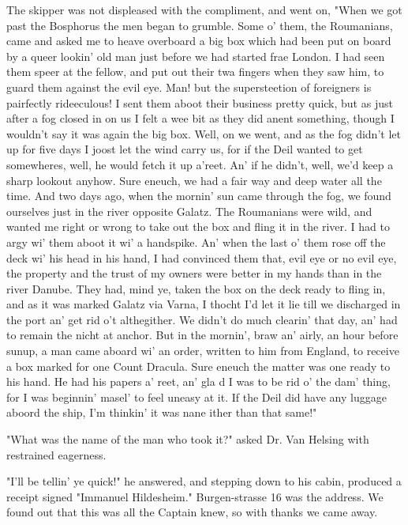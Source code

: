 The skipper was not displeased with the compliment, and went on, "When we got past the Bosphorus the men began to grumble. Some o' them, the Roumanians, came and asked me to heave overboard a big box which had been put on board by a queer lookin' old man just before we had started frae London. I had seen them speer at the fellow, and put out their twa fingers when they saw him, to guard them against the evil eye. Man! but the supersteetion of foreigners is pairfectly rideeculous! I sent them aboot their business pretty quick, but as just after a fog closed in on us I felt a wee bit as they did anent something, though I wouldn't say it was again the big box. Well, on we went, and as the fog didn't let up for five days I joost let the wind carry us, for if the Deil wanted to get somewheres, well, he would fetch it up a'reet. An' if he didn't, well, we'd keep a sharp lookout anyhow. Sure eneuch, we had a fair way and deep water all the time. And two days ago, when the mornin' sun came through the fog, we found ourselves just in the river opposite Galatz. The Roumanians were wild, and wanted me right or wrong to take out the box and fling it in the river. I had to argy wi' them aboot it wi' a handspike. An' when the last o' them rose off the deck wi' his head in his hand, I had convinced them that, evil eye or no evil eye, the property and the trust of my owners were better in my hands than in the river Danube. They had, mind ye, taken the box on the deck ready to fling in, and as it was marked Galatz via Varna, I thocht I'd let it lie till we discharged in the port an' get rid o't althegither. We didn't do much clearin' that day, an' had to remain the nicht at anchor. But in the mornin', braw an' airly, an hour before sunup, a man came aboard wi' an order, written to him from England, to receive a box marked for one Count Dracula. Sure eneuch the matter was one ready to his hand. He had his papers a' reet, an' gla d I was to be rid o' the dam' thing, for I was beginnin' masel' to feel uneasy at it. If the Deil did have any luggage aboord the ship, I'm thinkin' it was nane ither than that same!" 

"What was the name of the man who took it?" asked Dr. Van Helsing with restrained eagerness. 

"I'll be tellin' ye quick!" he answered, and stepping down to his cabin, produced a receipt signed "Immanuel Hildesheim." Burgen-strasse 16 was the address. We found out that this was all the Captain knew, so with thanks we came away. 

